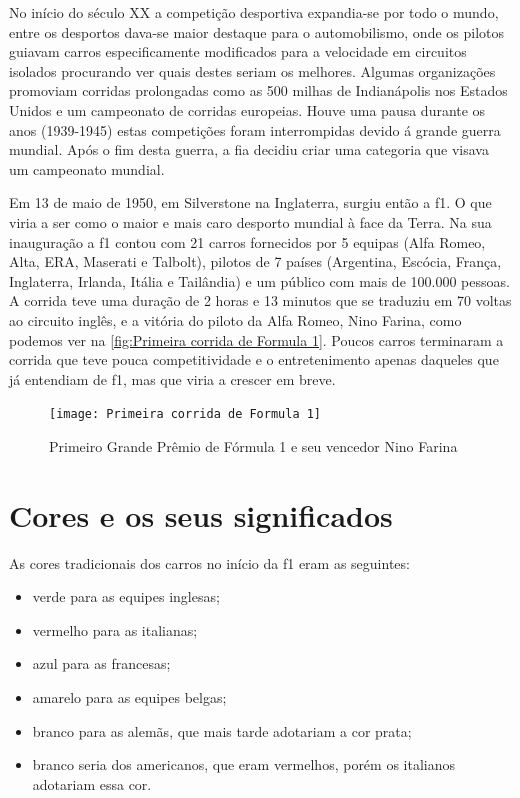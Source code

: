 \documentclass{report}
\begin{document}
No início do século XX a competição desportiva expandia-se por todo o mundo, entre os desportos dava-se maior destaque para o automobilismo, onde os pilotos guiavam carros especificamente modificados para a velocidade em circuitos isolados procurando ver quais destes seriam os melhores. Algumas organizações promoviam corridas prolongadas como as 500 milhas de Indianápolis nos Estados Unidos e um campeonato de corridas europeias. 
Houve uma pausa durante os anos (1939-1945) estas competições foram interrompidas devido á grande guerra mundial. Após o fim desta guerra, a \ac{fia} decidiu criar uma categoria que visava um campeonato mundial.


Em 13 de maio de 1950, em Silverstone na Inglaterra, surgiu então a \ac{f1}. O que viria a ser como o maior e mais caro desporto mundial à face da Terra. Na sua inauguração a \ac{f1} contou com 21 carros fornecidos por 5 equipas (Alfa Romeo, Alta, ERA, Maserati e Talbolt), pilotos de 7 países (Argentina, Escócia, França, Inglaterra, Irlanda, Itália e Tailândia) e um público com mais de 100.000 pessoas. A corrida teve uma duração de 2 horas e 13 minutos que se traduziu em 70 voltas ao circuito inglês, e a vitória do piloto da Alfa Romeo, Nino Farina, como podemos ver na \autoref{fig:Primeira corrida de Formula 1}. Poucos carros terminaram a corrida que teve pouca competitividade e o entretenimento apenas daqueles que já entendiam de \ac{f1}, mas que viria a crescer em breve.\\[2cm]
\begin{figure}[h]
\center %
\texttt{[image: Primeira corrida de Formula 1]}
\caption{Primeiro Grande Prêmio de Fórmula 1 e seu vencedor Nino Farina}
\label{fig:Primeira corrida de Formula 1}
\end{figure}
 
\section{Cores e os seus significados} 

As cores tradicionais dos carros no início da \ac{f1} eram as seguintes:

\begin{itemize}
\item verde para as equipes inglesas;
\item vermelho para as italianas;
\item azul para as francesas;
\item amarelo para as equipes belgas;
\item branco para as alemãs, que mais tarde adotariam a cor prata;
\item branco seria dos americanos, que eram vermelhos, porém os italianos adotariam essa cor.
\end{itemize}
\end{document}
